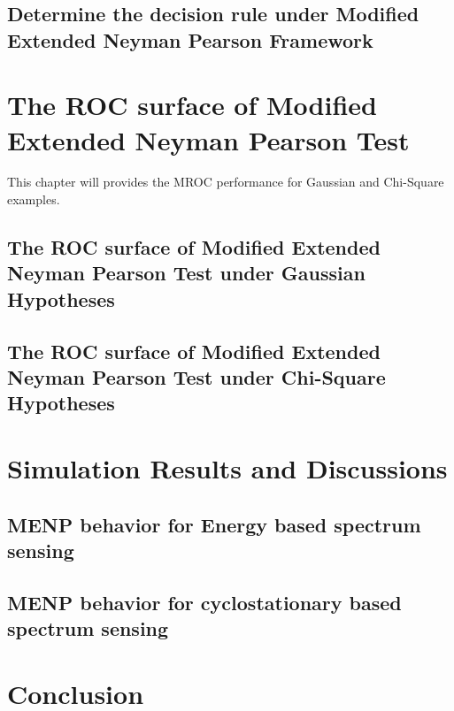 \documentclass{article}
\begin{document}
\begin{spacing}{2.0}
\subsection{Determine the decision rule under Modified Extended Neyman Pearson Framework}
\newpage
\section{The ROC surface of Modified Extended Neyman Pearson Test}
This chapter will provides the MROC performance for Gaussian and Chi-Square examples. 
\subsection{The ROC surface of Modified Extended Neyman Pearson Test under Gaussian Hypotheses}
\subsection{The ROC surface of Modified Extended Neyman Pearson Test under Chi-Square Hypotheses}
\newpage
\section{Simulation Results and Discussions}
\subsection{MENP behavior for Energy based spectrum sensing}
\subsection{MENP behavior for cyclostationary based spectrum sensing}
\newpage
\section{ Conclusion}
\newpage
\end{spacing}
\end{document}
